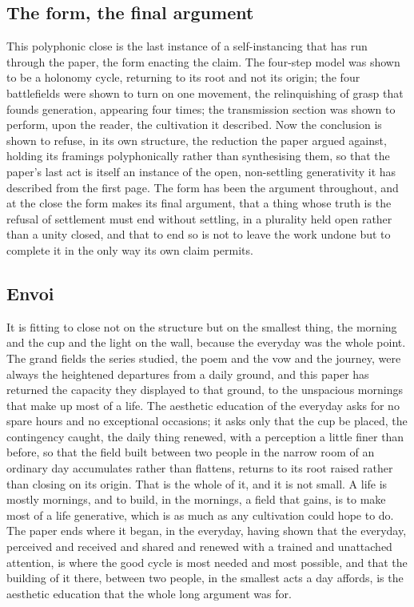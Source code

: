 \subsection{The form, the final argument}
\label{p22:sub:conc-form}

This polyphonic close is the last instance of a self-instancing that has run through the paper, the form enacting the claim. The four-step model was shown to be a holonomy cycle, returning to its root and not its origin; the four battlefields were shown to turn on one movement, the relinquishing of grasp that founds generation, appearing four times; the transmission section was shown to perform, upon the reader, the cultivation it described. Now the conclusion is shown to refuse, in its own structure, the reduction the paper argued against, holding its framings polyphonically rather than synthesising them, so that the paper's last act is itself an instance of the open, non-settling generativity it has described from the first page. The form has been the argument throughout, and at the close the form makes its final argument, that a thing whose truth is the refusal of settlement must end without settling, in a plurality held open rather than a unity closed, and that to end so is not to leave the work undone but to complete it in the only way its own claim permits.

\subsection{Envoi}
\label{p22:sub:conc-envoi}

It is fitting to close not on the structure but on the smallest thing, the morning and the cup and the light on the wall, because the everyday was the whole point. The grand fields the series studied, the poem and the vow and the journey, were always the heightened departures from a daily ground, and this paper has returned the capacity they displayed to that ground, to the unspacious mornings that make up most of a life. The aesthetic education of the everyday asks for no spare hours and no exceptional occasions; it asks only that the cup be placed, the contingency caught, the daily thing renewed, with a perception a little finer than before, so that the field built between two people in the narrow room of an ordinary day accumulates rather than flattens, returns to its root raised rather than closing on its origin. That is the whole of it, and it is not small. A life is mostly mornings, and to build, in the mornings, a field that gains, is to make most of a life generative, which is as much as any cultivation could hope to do. The paper ends where it began, in the everyday, having shown that the everyday, perceived and received and shared and renewed with a trained and unattached attention, is where the good cycle is most needed and most possible, and that the building of it there, between two people, in the smallest acts a day affords, is the aesthetic education that the whole long argument was for.

